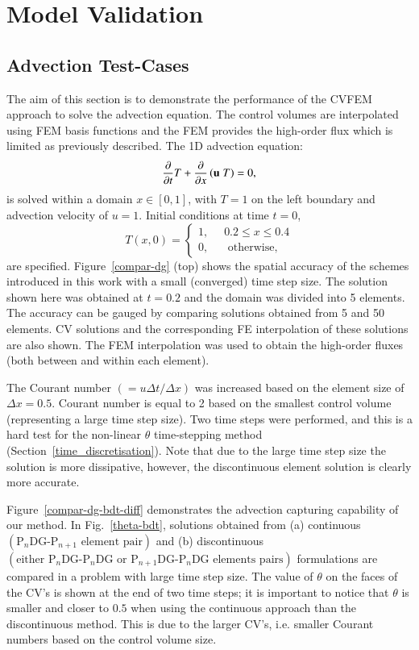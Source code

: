 \documentclass[preprint,authoryear,12pt]{elsarticle}
\begin{document}
\section{Model Validation}\label{Section:Results}%
\subsection{Advection Test-Cases}
The aim of this section is to demonstrate the performance of the CVFEM approach to solve the advection equation. The control volumes are interpolated using FEM basis functions and the FEM provides the high-order flux which is limited as previously described. The 1D advection equation:
\begin{displaymath}
  \displaystyle\frac{\partial}{\partial t} T + \frac{\partial}{\partial x} \left( {\bf u}\;T \right) = 0, 
\end{displaymath}
is solved within a domain $x\in \left[0,1\right]$, with $T=1$ on the left boundary and advection velocity of $u=1$. Initial conditions at time $t=0$,
\begin{displaymath}
  T\left( x,0\right)= \begin{cases} 1, \;\; &  0.2 \le  x \le 0.4 \\
    0, & \mbox{ otherwise,}
  \end{cases}
\end{displaymath}
are specified. Figure~\ref{compar-dg} (top) shows the spatial accuracy of the schemes introduced in this work with a small (converged) time step size. The solution shown here was obtained at $t=0.2$ and the domain was divided into 5 elements. The accuracy can be gauged by comparing solutions obtained from 5 and 50 elements. CV solutions and the corresponding FE interpolation of these solutions are also shown. The FEM interpolation was used to obtain the high-order fluxes (both between and within each element). 

The Courant number $\left(=u\Delta t / \Delta x\right)$ was increased based on the element size of $\Delta x = 0.5$. Courant number is equal to 2 based on the smallest control volume (representing a large time step size). Two time steps were performed, and this is a hard test for the non-linear $\theta$ time-stepping method (Section~\ref{time_discretisation}). Note that due to the large time step size the solution is more dissipative, however, the discontinuous element solution is clearly more accurate. 

Figure~\ref{compar-dg-bdt-diff} demonstrates the advection capturing capability of our method. In Fig.~\ref{theta-bdt}, solutions obtained from (a) continuous $\left(\text{P}_{n}\text{DG-P}_{n+1}\text{ element pair}\right)$ and (b) discontinuous $\left(\text{either P}_{n}\text{DG-P}_{n}\text{DG  or P}_{n+1}\text{DG-P}_{n}\text{DG elements pairs}\right)$ formulations are compared in a problem with large time step size. The value of $\theta$ on the faces of the CV's is shown at the end of two time steps; it is important to notice that $\theta$ is smaller and closer to $0.5$ when using the continuous approach than the discontinuous method. This is due to the larger CV's, i.e. smaller Courant numbers based on the control volume size.
\end{document}
